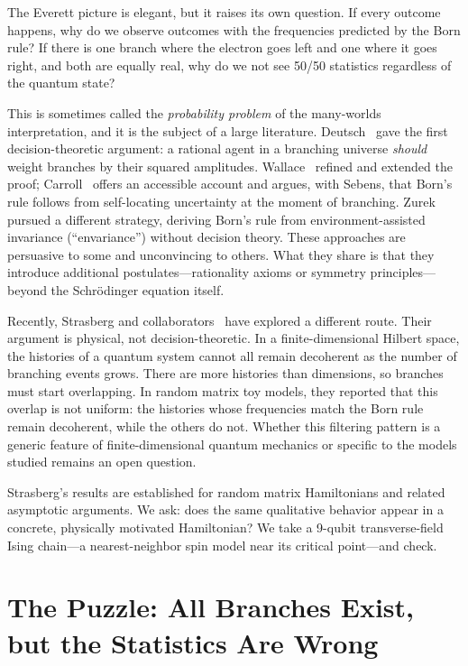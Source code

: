 \documentclass[aps,prd,twocolumn,showpacs,preprintnumbers,amsmath,amssymb,nofootinbib]{revtex4-2}
\begin{document}
The Everett picture is elegant, but it raises its own question. If every outcome
happens, why do we observe outcomes with the frequencies predicted by the Born rule?
If there is one branch where the electron goes left and one where it goes right,
and both are equally real, why do we not see 50/50 statistics regardless of the
quantum state?

This is sometimes called the \emph{probability problem} of the many-worlds
interpretation, and it is the subject of a large literature.
Deutsch~\cite{Deutsch1999} gave the first decision-theoretic argument:
a rational agent in a branching universe \emph{should} weight branches by their
squared amplitudes. Wallace~\cite{Wallace2012} refined and extended the proof;
Carroll~\cite{Carroll2019} offers an accessible account and argues,
with Sebens, that Born's rule follows from self-locating uncertainty at the
moment of branching.
Zurek~\cite{Zurek2005} pursued a different strategy, deriving Born's rule from
environment-assisted invariance (``envariance'') without decision theory.
These approaches are persuasive to some and unconvincing to others. What they share
is that they introduce additional postulates---rationality axioms or
symmetry principles---beyond the Schr\"odinger equation itself.

Recently, Strasberg and collaborators~\cite{Strasberg2024, StrasbergSchindler2024,
Strasberg2025} have explored a different route. Their argument is physical, not
decision-theoretic. In a finite-dimensional Hilbert space, the histories of a
quantum system cannot all remain decoherent as the number of branching events grows.
There are more histories than dimensions, so branches must start overlapping.
In random matrix toy models, they reported that this overlap is not uniform: the
histories whose frequencies match the Born rule remain decoherent, while the others
do not. Whether this filtering pattern is a generic feature of finite-dimensional
quantum mechanics or specific to the models studied remains an open question.

Strasberg's results are established for random matrix Hamiltonians and related
asymptotic arguments. We ask: does the same qualitative behavior appear in a
concrete, physically motivated Hamiltonian? We take a 9-qubit transverse-field Ising
chain---a nearest-neighbor spin model near its critical point---and check.


\section{The Puzzle: All Branches Exist, but the Statistics Are Wrong}
\label{sec:puzzle}
\end{document}
